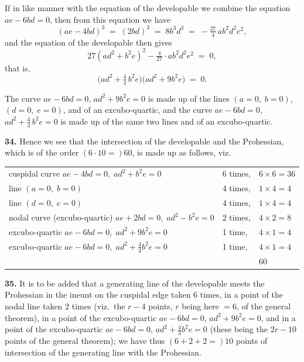 \documentclass[11pt,a4paper]{article}
\begin{document}
If in like manner with the equation of the developable we combine the equation $ae - 6bd = 0$, then from this equation we have
\[
(ae - 4bd)^3 \;=\; (2bd)^3 \;=\; 8 b^3 d^3 \;=\; -\tfrac{27}{4}\, ab^2 d^2 e^2,
\]
and the equation of the developable then gives
\[
27(ad^2 + b^2 e)^2 - \tfrac{4}{27}\cdot ab^2 d^2 e^2 \;=\; 0,
\]
that is,
\[
\bigl(ad^2 + \tfrac{4}{3}\, b^2 e\bigr)\bigl(ad^2 + 9b^2 e\bigr) \;=\; 0.
\]

\medskip

The curve $ae - 6bd = 0$, $ad^2 + 9b^2 e = 0$ is made up of the lines $(a = 0,\;b = 0)$, $(d = 0,\;e = 0)$, and of an excubo-quartic, and the curve $ae - 6bd = 0$, $ad^2 + \tfrac{4}{3}\, b^2 e = 0$ is made up of the same two lines and of an excubo-quartic.

\medskip

\textbf{34.} Hence we see that the intersection of the developable and the Prohessian, which is of the order $(6 \cdot 10 =) 60$, is made up as follows, viz.
\begin{center}
\begin{tabular}{lll}
cuspidal curve $ae - 4bd = 0,\;ad^2 + b^2 e = 0$ & 6 times, & $6 \times 6 = 36$\\
line $(a = 0,\;b = 0)$ & 4 times, & $1 \times 4 = 4$\\
line $(d = 0,\;e = 0)$ & 4 times, & $1 \times 4 = 4$\\
nodal curve (excubo-quartic) $ae + 2bd = 0,\;ad^2 - b^2 e = 0$ & 2 times, & $4 \times 2 = 8$\\
excubo-quartic $ae - 6bd = 0,\;ad^2 + 9 b^2 e = 0$ & 1 time, & $4 \times 1 = 4$\\
excubo-quartic $ae - 6bd = 0,\;ad^2 + \tfrac{4}{3} b^2 e = 0$ & 1 time, & $4 \times 1 = 4$\\
\hline
 & & 60
\end{tabular}
\end{center}

\medskip

\textbf{35.} It is to be added that a generating line of the developable meets the Prohessian in the ineunt on the cuspidal edge taken $6$ times, in a point of the nodal line taken $2$ times (viz.\ the $r - 4$ points, $r$ being here $=6$, of the general theorem), in a point of the excubo-quartic $ae - 6bd = 0$, $ad^2 + 9 b^2 e = 0$, and in a point of the excubo-quartic $ae - 6bd = 0$, $ad^2 + \tfrac{4}{3} b^2 e = 0$ (these being the $2r - 10$ points of the general theorem); we have thus $(6 + 2 + 2 =) 10$ points of intersection of the generating line with the Prohessian.
\end{document}
